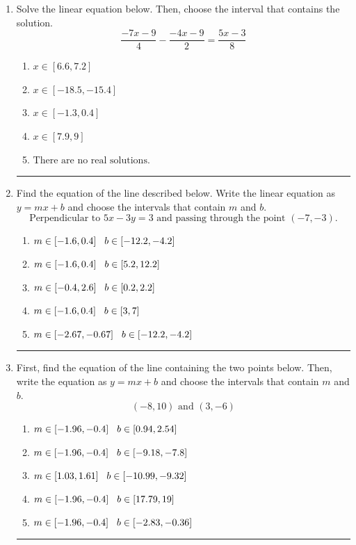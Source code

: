 \documentclass[14pt]{extbook}
\newcommand{\litem}[1]{\item#1\hspace*{-1cm}\rule{\textwidth}{0.4pt}}
\begin{document}
\begin{enumerate}
{\begin{enumerate}[label=\Alph*.]
\end{enumerate} }
\litem{
Solve the linear equation below. Then, choose the interval that contains the solution.\[ \frac{-7x -9}{4} - \frac{-4x -9}{2} = \frac{5x -3}{8} \]\begin{enumerate}[label=\Alph*.]
\item \( x \in [6.6, 7.2] \)
\item \( x \in [-18.5, -15.4] \)
\item \( x \in [-1.3, 0.4] \)
\item \( x \in [7.9, 9] \)
\item \( \text{There are no real solutions.} \)

\end{enumerate} }
\litem{
Find the equation of the line described below. Write the linear equation as $ y=mx+b $ and choose the intervals that contain $m$ and $b$.\[ \text{Perpendicular to } 5 x - 3 y = 3 \text{ and passing through the point } (-7, -3). \]\begin{enumerate}[label=\Alph*.]
\item \( m \in [-1.6, 0.4] \hspace*{3mm} b \in [-12.2, -4.2] \)
\item \( m \in [-1.6, 0.4] \hspace*{3mm} b \in [5.2, 12.2] \)
\item \( m \in [-0.4, 2.6] \hspace*{3mm} b \in [0.2, 2.2] \)
\item \( m \in [-1.6, 0.4] \hspace*{3mm} b \in [3, 7] \)
\item \( m \in [-2.67, -0.67] \hspace*{3mm} b \in [-12.2, -4.2] \)

\end{enumerate} }
\litem{
First, find the equation of the line containing the two points below. Then, write the equation as $ y=mx+b $ and choose the intervals that contain $m$ and $b$.\[ (-8, 10) \text{ and } (3, -6) \]\begin{enumerate}[label=\Alph*.]
\item \( m \in [-1.96, -0.4] \hspace*{3mm} b \in [0.94, 2.54] \)
\item \( m \in [-1.96, -0.4] \hspace*{3mm} b \in [-9.18, -7.8] \)
\item \( m \in [1.03, 1.61] \hspace*{3mm} b \in [-10.99, -9.32] \)
\item \( m \in [-1.96, -0.4] \hspace*{3mm} b \in [17.79, 19] \)
\item \( m \in [-1.96, -0.4] \hspace*{3mm} b \in [-2.83, -0.36] \)


\end{enumerate}}
\end{enumerate}
\end{document}

